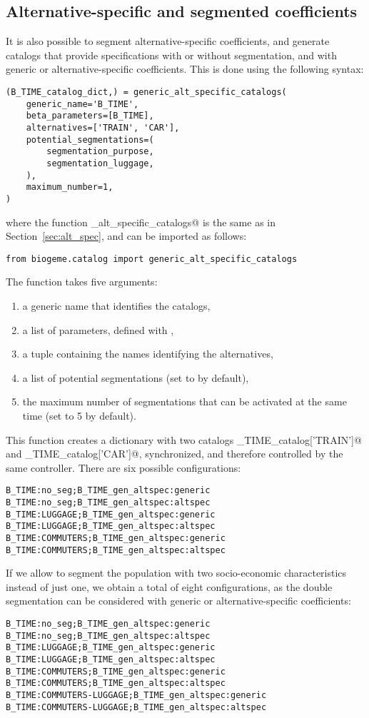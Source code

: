 \documentclass[12pt,a4paper]{article}
\begin{document}
\subsection{Alternative-specific and segmented coefficients}

It is also possible to segment alternative-specific coefficients, and
generate catalogs that provide specifications with or without
segmentation, and with generic or alternative-specific coefficients. This is done using the following syntax:
\begin{lstlisting}
(B_TIME_catalog_dict,) = generic_alt_specific_catalogs(
    generic_name='B_TIME',
    beta_parameters=[B_TIME],
    alternatives=['TRAIN', 'CAR'],
    potential_segmentations=(
        segmentation_purpose,
        segmentation_luggage,
    ),
    maximum_number=1,
)
\end{lstlisting}
where the function \lstinline@generic_alt_specific_catalogs@ is the same as in Section~\ref{sec:alt_spec}, and can be imported as follows:
\begin{lstlisting}
from biogeme.catalog import generic_alt_specific_catalogs
\end{lstlisting}
The function takes five arguments:
\begin{enumerate}
\item a generic name that identifies the catalogs,
\item a list of parameters, defined with \lstinline@Beta@,
\item a tuple containing the names identifying the alternatives,
\item a list of potential segmentations (set to \lstinline@None@ by default),
\item the maximum number of segmentations that can be activated at the same time (set to 5 by default). 
\end{enumerate}
This function creates a dictionary with two catalogs \lstinline@B_TIME_catalog['TRAIN']@ and \lstinline@B_TIME_catalog['CAR']@, synchronized, and therefore controlled by the same controller.
There are six possible configurations:
\begin{lstlisting}
B_TIME:no_seg;B_TIME_gen_altspec:generic
B_TIME:no_seg;B_TIME_gen_altspec:altspec
B_TIME:LUGGAGE;B_TIME_gen_altspec:generic
B_TIME:LUGGAGE;B_TIME_gen_altspec:altspec
B_TIME:COMMUTERS;B_TIME_gen_altspec:generic
B_TIME:COMMUTERS;B_TIME_gen_altspec:altspec
\end{lstlisting}
If we allow to segment the population with two socio-economic characteristics instead of just one, we obtain a total of eight configurations, as the double segmentation can be considered with generic or alternative-specific coefficients:
\begin{lstlisting}
B_TIME:no_seg;B_TIME_gen_altspec:generic
B_TIME:no_seg;B_TIME_gen_altspec:altspec
B_TIME:LUGGAGE;B_TIME_gen_altspec:generic
B_TIME:LUGGAGE;B_TIME_gen_altspec:altspec
B_TIME:COMMUTERS;B_TIME_gen_altspec:generic
B_TIME:COMMUTERS;B_TIME_gen_altspec:altspec
B_TIME:COMMUTERS-LUGGAGE;B_TIME_gen_altspec:generic
B_TIME:COMMUTERS-LUGGAGE;B_TIME_gen_altspec:altspec
\end{lstlisting}
\end{document}
